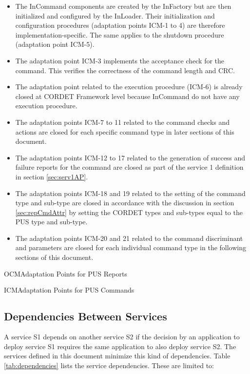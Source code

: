 \documentclass{pnp_article}
\begin{document}
\begin{itemize}
\item The InCommand components are created by the InFactory but are then initialized and configured by the InLoader. Their initialization and configuration procedures (adaptation points ICM-1 to 4) are therefore implementation-specific. The same applies to the shutdown procedure (adaptation point ICM-5).
\item The adaptation point ICM-3 implements the acceptance check for the command. This verifies the correctness of the command length and CRC.
\item The adaptation point related to the execution procedure (ICM-6) is already closed at CORDET Framework level because InCommand do not have any execution procedure.
\item The adaptation points ICM-7 to 11 related to the command checks and actions are closed for each specific command type in later sections of this document.
\item The adaptation points ICM-12 to 17 related to the generation of success and failure reports for the command are closed as part of the service 1 definition in section \ref{sec:serv1AP}.
\item The adaptation points ICM-18 and 19 related to the setting of the command type and sub-type are closed in accordance with the discussion in section \ref{sec:repCmdAttr} by setting the CORDET types and sub-types equal to the PUS type and sub-type.
\item The adaptation points ICM-20 and 21 related to the command discriminant and parameters are closed for each individual command type in the following sections of this document.
\end{itemize}

\begin{crAp}{OCM}{Adaptation Points for PUS Reports}
\end{crAp}

\newpage
\begin{crAp}{ICM}{Adaptation Points for PUS Commands}
\end{crAp}

\subsection{Dependencies Between Services}\label{sec:dependencies}
A service S1 depends on another service S2 if the decision by an application to deploy service S1 requires the same application to also deploy service S2. The services defined in this document minimize this kind of dependencies. Table \ref{tab:dependencies} lists the service dependencies. These are limited to:
\end{document}
